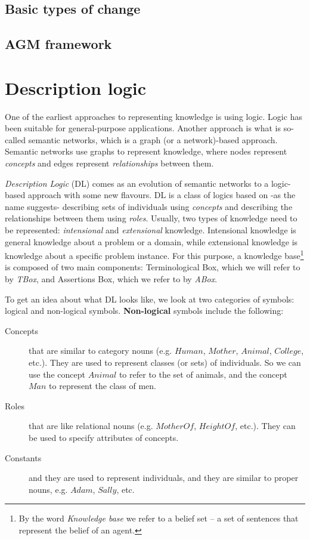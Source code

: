 \subsection{Basic types of change}
\subsection{AGM framework}
\section{Description logic}
\label{dl}
One of the earliest approaches to representing knowledge is using logic. Logic has been suitable for general-purpose applications. Another approach is what is so-called semantic networks, which is a graph (or a network)-based approach. Semantic networks use graphs to represent knowledge\cite{dl}, where nodes represent \textit{concepts} and edges represent \textit{relationships} between them.

\textit{Description Logic} (DL) comes as an evolution of semantic networks to a logic-based approach with some new flavours. DL is a class of logics based on -as the name suggests- describing sets of individuals using \textit{concepts} and describing the relationships between them using \textit{roles}. Usually, two types of knowledge need to be represented: \textit{intensional} and \textit{extensional} knowledge. Intensional knowledge is general knowledge about a problem or a domain, while extensional knowledge is knowledge about a specific problem instance. For this purpose, a knowledge base\footnote{By the word \textit{Knowledge base} we refer to a belief set -- a set of sentences that represent the belief of an agent.} is composed of two main components: Terminological Box, which we will refer to by \textit{TBox}, and Assertions Box, which we refer to by \textit{ABox}.

To get an idea about what DL looks like, we look at two categories of symbols: logical and non-logical symbols. \textbf{Non-logical} symbols include the following:
\begin{description}
\item[Concepts] that are similar to category nouns (e.g. $Human$, $Mother$, $Animal$, $College$, etc.). They are used to represent classes (or sets) of individuals. So we can use the concept $Animal$ to refer to the set of animals, and the concept $Man$ to represent the class of men.
\item[Roles] that are like relational nouns (e.g. $MotherOf$, $HeightOf$, etc.). They can be used to specify attributes of concepts.
\item[Constants] and they are used to represent individuals, and they are similar to proper nouns, e.g. $Adam$, $Sally$, etc.
\end{description}

